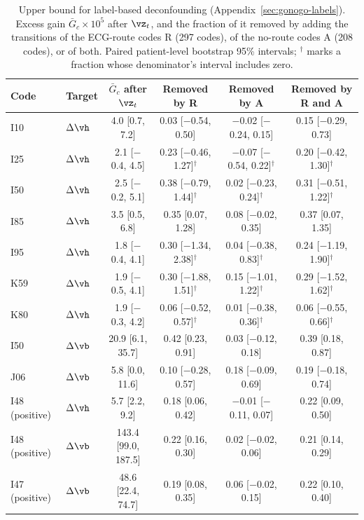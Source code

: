 \begin{table}[t]
\caption{Upper bound for label-based deconfounding (Appendix~\ref{sec:gonogo-labels}). Excess gain $\bar G_c\times10^{5}$ after $\vz_t$, and the fraction of it removed by adding the transitions of the ECG-route codes R (297 codes), of the no-route codes A (208 codes), or of both. Paired patient-level bootstrap 95\% intervals; $^\dagger$ marks a fraction whose denominator's interval includes zero.}
\label{tab:gonogo-labelsets}
\centering
\small
\begin{tabular}{@{}ll c ccc@{}}
\toprule
\textbf{Code} & \textbf{Target} & \textbf{$\bar G_c$ after $\vz_t$} & \textbf{Removed by R} & \textbf{Removed by A} & \textbf{Removed by R and A} \\
\midrule
I10 & $\Delta\vh$ & 4.0 [0.7, 7.2] & 0.03 [$-$0.54, 0.50] & $-$0.02 [$-$0.24, 0.15] & 0.15 [$-$0.29, 0.73] \\
I25 & $\Delta\vh$ & 2.1 [$-$0.4, 4.5] & 0.23 [$-$0.46, 1.27]$^\dagger$ & $-$0.07 [$-$0.54, 0.22]$^\dagger$ & 0.20 [$-$0.42, 1.30]$^\dagger$ \\
I50 & $\Delta\vh$ & 2.5 [$-$0.2, 5.1] & 0.38 [$-$0.79, 1.44]$^\dagger$ & 0.02 [$-$0.23, 0.24]$^\dagger$ & 0.31 [$-$0.51, 1.22]$^\dagger$ \\
I85 & $\Delta\vh$ & 3.5 [0.5, 6.8] & 0.35 [0.07, 1.28] & 0.08 [$-$0.02, 0.35] & 0.37 [0.07, 1.35] \\
I95 & $\Delta\vh$ & 1.8 [$-$0.4, 4.1] & 0.30 [$-$1.34, 2.38]$^\dagger$ & 0.04 [$-$0.38, 0.83]$^\dagger$ & 0.24 [$-$1.19, 1.90]$^\dagger$ \\
K59 & $\Delta\vh$ & 1.9 [$-$0.5, 4.1] & 0.30 [$-$1.88, 1.51]$^\dagger$ & 0.15 [$-$1.01, 1.22]$^\dagger$ & 0.29 [$-$1.52, 1.62]$^\dagger$ \\
K80 & $\Delta\vh$ & 1.9 [$-$0.3, 4.2] & 0.06 [$-$0.52, 0.57]$^\dagger$ & 0.01 [$-$0.38, 0.36]$^\dagger$ & 0.06 [$-$0.55, 0.66]$^\dagger$ \\
I50 & $\Delta\vb$ & 20.9 [6.1, 35.7] & 0.42 [0.23, 0.91] & 0.03 [$-$0.12, 0.18] & 0.39 [0.18, 0.87] \\
J06 & $\Delta\vb$ & 5.8 [0.0, 11.6] & 0.10 [$-$0.28, 0.57] & 0.18 [$-$0.09, 0.69] & 0.19 [$-$0.18, 0.74] \\
\addlinespace
I48 (positive) & $\Delta\vh$ & 5.7 [2.2, 9.2] & 0.18 [0.06, 0.42] & $-$0.01 [$-$0.11, 0.07] & 0.22 [0.09, 0.50] \\
I48 (positive) & $\Delta\vb$ & 143.4 [99.0, 187.5] & 0.22 [0.16, 0.30] & 0.02 [$-$0.02, 0.06] & 0.21 [0.14, 0.29] \\
I47 (positive) & $\Delta\vb$ & 48.6 [22.4, 74.7] & 0.19 [0.08, 0.35] & 0.06 [$-$0.02, 0.15] & 0.22 [0.10, 0.40] \\
\bottomrule
\end{tabular}
\end{table}

